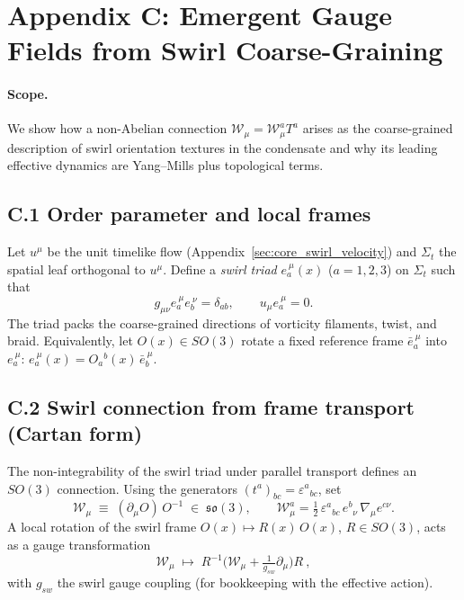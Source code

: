\section*{Appendix C: Emergent Gauge Fields from Swirl Coarse-Graining}
\label{sec:swirl-connection}

\paragraph{Scope.}
We show how a non-Abelian connection \(\mathcal{W}_\mu=\mathcal{W}_\mu^a T^a\) arises as the coarse-grained description of swirl orientation textures in the condensate and why its leading effective dynamics are Yang–Mills plus topological terms.

\subsection*{C.1 Order parameter and local frames}
Let \(u^\mu\) be the unit timelike flow (Appendix~\ref{sec:core_swirl_velocity}) and \(\Sigma_t\) the spatial leaf orthogonal to \(u^\mu\).
Define a \emph{swirl triad} \(e_a^{\ \mu}(x)\) (\(a=1,2,3\)) on \(\Sigma_t\) such that
\[
 g_{\mu\nu}e_a^{\ \mu}e_b^{\ \nu}=\delta_{ab},\qquad u_\mu e_a^{\ \mu}=0.
\]
The triad packs the coarse-grained directions of vorticity filaments, twist, and braid. Equivalently, let \(O(x)\in SO(3)\) rotate a fixed reference frame \(\bar e_a^{\ \mu}\) into \(e_a^{\ \mu}\):
\(e_a^{\ \mu}(x)=O_a{}^{b}(x)\,\bar e_b^{\ \mu}\).

\subsection*{C.2 Swirl connection from frame transport (Cartan form)}
The non-integrability of the swirl triad under parallel transport defines an \(SO(3)\) connection.
Using the generators \((t^a)_{bc}=\varepsilon^a{}_{bc}\), set
\[
 \boxed{\quad \mathcal{W}_\mu \;\equiv\; (\partial_\mu O)\,O^{-1} \;\in\; \mathfrak{so}(3), \qquad
 \mathcal{W}_\mu^a=\tfrac12\,\varepsilon^{a}{}_{bc}\,e^{b}{}_{\nu}\,\nabla_\mu e^{c\nu}. \quad}
\]
A local rotation of the swirl frame \(O(x)\mapsto R(x)\,O(x)\), \(R\in SO(3)\), acts as a gauge transformation
\[
 \boxed{\quad \mathcal{W}_\mu \;\longmapsto\; R^{-1}\!\Big(\mathcal{W}_\mu + \tfrac{1}{g_{\!sw}}\partial_\mu\Big)R\ ,\quad}
\]
with \(g_{\!sw}\) the swirl gauge coupling (for bookkeeping with the effective action).

